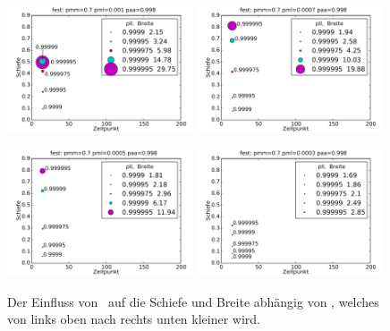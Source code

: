 \begin{figure}[]

\includegraphics[width=0.49\textwidth]{bilder/pll/3fest_07_0001_0998_p}
\includegraphics[width=0.49\textwidth]{bilder/pll/3fest_07_00007_0998_p}

\vspace*{5pt}

\includegraphics[width=0.49\textwidth]{bilder/pll/3fest_07_00005_0998_p}
\includegraphics[width=0.49\textwidth]{bilder/pll/3fest_07_00003_0998_p}
\caption[Der Einfluss von \pll\ auf die Schiefe und Breite abhängig von \pml]{Der Einfluss von \pll\ auf die Schiefe und Breite abhängig von \pml, welches von links oben nach rechts unten kleiner wird.}
\label{einfluss_pll_pml}
\end{figure}

